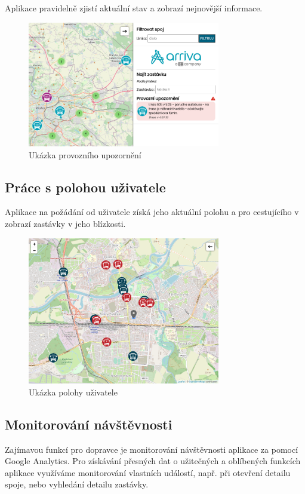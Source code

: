 Aplikace pravidelně zjistí aktuální stav a zobrazí nejnovější informace.

\par
\begin{figure}[H]
    \centering
    \includegraphics[width=0.75\textwidth]{images/global_arriva_event.png}
    \caption{Ukázka provozního upozornění}
    \label{upozorneni}
\end{figure}
\subsection{Práce s polohou uživatele}
Aplikace na požádání od uživatele získá jeho aktuální polohu a pro cestujícího v zobrazí zastávky v jeho blízkosti.

\begin{figure}[H]
    \centering
    \includegraphics[width=0.75\textwidth]{images/position.png}
    \caption{Ukázka polohy uživatele}
    \label{poloha}
\end{figure}
\subsection{Monitorování návštěvnosti}
Zajímavou funkcí pro dopravce je monitorování návštěvnosti aplikace za pomocí Google Analytics. Pro získávání přesných dat o užitečných a oblíbených funkcích aplikace využíváme monitorování vlastních událostí, např. při otevření detailu spoje, nebo vyhledání detailu zastávky.
